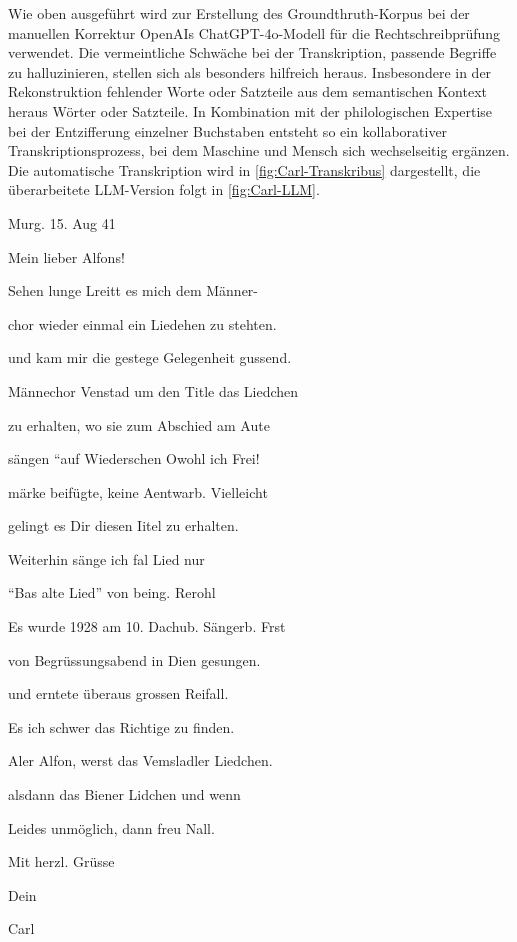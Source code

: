 \documentclass[12pt, a4paper, ngerman, bidi=default]{article}
\begin{document}
\begin{minipage}[t]{0.52\textwidth}
  \justifying
  \noindent
Wie oben ausgeführt wird zur 
Erstellung des Groundthruth-Korpus bei der manuellen Korrektur OpenAIs ChatGPT-4o-Modell für die Rechtschreibprüfung verwendet. Die vermeintliche Schwäche 
bei der Transkription, passende Begriffe zu halluzinieren, stellen sich als besonders hilfreich heraus. Insbesondere in der Rekonstruktion fehlender Worte oder 
Satzteile aus dem semantischen Kontext heraus Wörter oder Satzteile. 
In Kombination mit der philologischen Expertise bei der Entzifferung einzelner Buchstaben entsteht so ein kollaborativer Transkriptionsprozess, 
bei dem Maschine und Mensch sich wechselseitig ergänzen. Die automatische Transkription wird in \autoref{fig:Carl-Transkribus} dargestellt, die überarbeitete LLM-Version folgt in \autoref{fig:Carl-LLM}.
\end{minipage}
\vspace{1em}
\begin{minipage}[t]{0.5\textwidth}
    \centering
    \vspace*{0cm}
  \begin{tcolorbox}[colback=oldLetter, colframe=black, sharp corners, width=0.8\textwidth]
    \tiny{Murg. 15. Aug 41 
    
    Mein lieber Alfons! 

    Sehen lunge Lreitt es mich dem Männer- 

    chor wieder einmal ein Liedehen zu stehten. 

    und kam mir die gestege Gelegenheit gussend. 

    Männechor Venstad um den Title das Liedchen 

    zu erhalten, wo sie zum Abschied am Aute 

    sängen ``auf Wiederschen Owohl ich Frei! 

    märke beifügte, keine Aentwarb. Vielleicht 

    gelingt es Dir diesen Iitel zu erhalten. 
    
    Weiterhin sänge ich fal Lied nur 
    
    ``Bas alte Lied'' von being. Rerohl 

    Es wurde 1928 am 10. Dachub. Sängerb. Frst 

    von Begrüssungsabend in Dien gesungen. 

    und erntete überaus grossen Reifall. 

    Es ich schwer das Richtige zu finden. 

    Aler Alfon, werst das Vemsladler Liedchen. 

    alsdann das Biener Lidchen und wenn 

    Leides unmöglich, dann freu Nall. 

    Mit herzl. Grüsse 

    Dein 

    Carl} 
  \end{tcolorbox}
\end{minipage}
\hfill%
\end{document}
